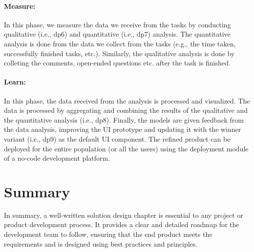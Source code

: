 \paragraph{Measure:}
\label{design:paragraph:measure}
In this phase, we measure the data we receive from the tasks by conducting qualitative (i.e., \ac{dp}6) and quantitative (i.e., \ac{dp}7) analysis.
The quantitative analysis is done from the data we collect from the tasks (e.g., the time taken, successfully finished tasks, etc.).
Similarly, the qualitative analysis is done by colleting the comments, open-ended questions etc. after the task is finished. 
\paragraph{Learn:}
\label{design:paragraph:learn}
In this phase, the data received from the analysis is processed and visualized. 
The data is processed by aggregating and combining the results of the qualitative and the quantitative analysis (i.e., \ac{dp}8). 
Finally, the models are given feedback from the data analysis, improving the UI prototype and updating it with the winner variant (i.e., \ac{dp}9) as the default UI component.
The refined product can be deployed for the entire population (or all the users) using the deployment module of a no-code development platform.

\section{Summary}
\label{design:section:summary}
In summary, a well-written solution design chapter is essential to any project or product development process. 
It provides a clear and detailed roadmap for the development team to follow, ensuring that the end product meets the requirements and is designed using best practices and principles.